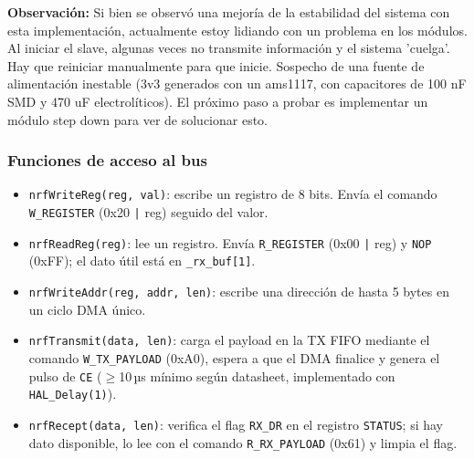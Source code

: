 \documentclass[12pt,a4paper]{article}
\begin{document}
\textbf{  Observación:} Si bien se observó una mejoría de la estabilidad del sistema con esta implementación, actualmente estoy lidiando con un problema en los módulos. Al iniciar el slave, algunas veces no transmite información y el sistema 'cuelga'. Hay que reiniciar manualmente para que inicie. Sospecho de una fuente de alimentación inestable (3v3 generados con un ams1117, con capacitores de 100 nF SMD y 470 uF electrolíticos). El próximo paso a probar es implementar un módulo step down para ver de solucionar esto.
  
  \subsubsection{Funciones de acceso al bus}                                                                                                                                                                                                                  
  
  \begin{itemize}                                                                                                                                                                                                                                             
      \item \texttt{nrfWriteReg(reg, val)}: escribe un registro de 8 bits. Envía el comando \texttt{W\_REGISTER} (0x20 \texttt{|} reg) seguido del valor.
      \item \texttt{nrfReadReg(reg)}: lee un registro. Envía \texttt{R\_REGISTER} (0x00 \texttt{|} reg) y \texttt{NOP} (0xFF); el dato útil está en \texttt{\_rx\_buf[1]}.                                                                                    
      \item \texttt{nrfWriteAddr(reg, addr, len)}: escribe una dirección de hasta 5 bytes en un ciclo DMA único.                                                                                                                                              
      \item \texttt{nrfTransmit(data, len)}: carga el payload en la TX FIFO mediante el comando \texttt{W\_TX\_PAYLOAD} (0xA0), espera a que el DMA finalice y genera el pulso de \texttt{CE} ($\geq$10\,µs mínimo según datasheet, implementado con          
  \texttt{HAL\_Delay(1)}).                                                                                                                                                                                                                                    
      \item \texttt{nrfRecept(data, len)}: verifica el flag \texttt{RX\_DR} en el registro \texttt{STATUS}; si hay dato disponible, lo lee con el comando \texttt{R\_RX\_PAYLOAD} (0x61) y limpia el flag.                                                    
  \end{itemize}                                                                                                                                                                                                                                               
  
\end{document}
